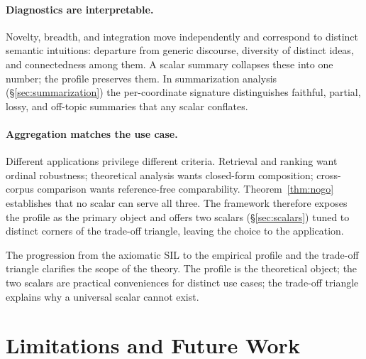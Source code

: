 \documentclass[11pt]{article}
\begin{document}
\paragraph{Diagnostics are interpretable.} Novelty, breadth, and integration move independently and correspond to distinct semantic intuitions: departure from generic discourse, diversity of distinct ideas, and connectedness among them. A scalar summary collapses these into one number; the profile preserves them. In summarization analysis (\S\ref{sec:summarization}) the per-coordinate signature distinguishes faithful, partial, lossy, and off-topic summaries that any scalar conflates.

\paragraph{Aggregation matches the use case.} Different applications privilege different criteria. Retrieval and ranking want ordinal robustness; theoretical analysis wants closed-form composition; cross-corpus comparison wants reference-free comparability. Theorem~\ref{thm:nogo} establishes that no scalar can serve all three. The framework therefore exposes the profile as the primary object and offers two scalars (\S\ref{sec:scalars}) tuned to distinct corners of the trade-off triangle, leaving the choice to the application.

The progression from the axiomatic SIL to the empirical profile and the trade-off triangle clarifies the scope of the theory. The profile is the theoretical object; the two scalars are practical conveniences for distinct use cases; the trade-off triangle explains why a universal scalar cannot exist.

\section{Limitations and Future Work}
\end{document}
